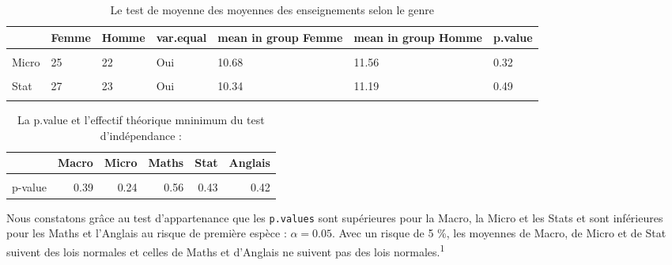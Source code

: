 \documentclass[
  11pt,
  french,
]{article}
\begin{document}
\begin{table}[!h]

\caption{\label{tab:tests4_non}Le test de moyenne des moyennes des enseignements selon le genre}
\centering
\begin{tabular}[t]{lllllll}
\toprule
  & Femme & Homme & var.equal & mean in group Femme & mean in group Homme & p.value\\
\midrule
\cellcolor{gray!6}{Macro} & \cellcolor{gray!6}{26} & \cellcolor{gray!6}{21} & \cellcolor{gray!6}{Oui} & \cellcolor{gray!6}{11.57} & \cellcolor{gray!6}{12.05} & \cellcolor{gray!6}{0.63}\\
Micro & 25 & 22 & Oui & 10.68 & 11.56 & 0.32\\
\cellcolor{gray!6}{Maths} & \cellcolor{gray!6}{29} & \cellcolor{gray!6}{26} & \cellcolor{gray!6}{Oui} & \cellcolor{gray!6}{5.93} & \cellcolor{gray!6}{6.4} & \cellcolor{gray!6}{0.68}\\
Stat & 27 & 23 & Oui & 10.34 & 11.19 & 0.49\\
\cellcolor{gray!6}{Anglais} & \cellcolor{gray!6}{29} & \cellcolor{gray!6}{29} & \cellcolor{gray!6}{Oui} & \cellcolor{gray!6}{11.8} & \cellcolor{gray!6}{10.26} & \cellcolor{gray!6}{0.25}\\
\bottomrule
\end{tabular}
\end{table}

\begin{table}[!h]

\caption{\label{tab:tests4_non}La p.value et l'effectif théorique mninimum du test d'indépendance :}
\centering
\begin{tabular}[t]{lrrrrr}
\toprule
  & Macro & Micro & Maths & Stat & Anglais\\
\midrule
\cellcolor{gray!6}{Eff\_théorique\_min} & \cellcolor{gray!6}{0.45} & \cellcolor{gray!6}{0.47} & \cellcolor{gray!6}{0.47} & \cellcolor{gray!6}{0.46} & \cellcolor{gray!6}{0.50}\\
p-value & 0.39 & 0.24 & 0.56 & 0.43 & 0.42\\
\bottomrule
\end{tabular}
\end{table}

Nous constatons grâce au test d'appartenance que les \texttt{p.values}
sont supérieures pour la Macro, la Micro et les Stats et sont
inférieures pour les Maths et l'Anglais au risque de première espèce :
\(\alpha = 0.05\). Avec un risque de 5 \%, les moyennes de Macro, de
Micro et de Stat suivent des lois normales et celles de Maths et
d'Anglais ne suivent pas des lois normales.\textsuperscript{1}
\end{document}
